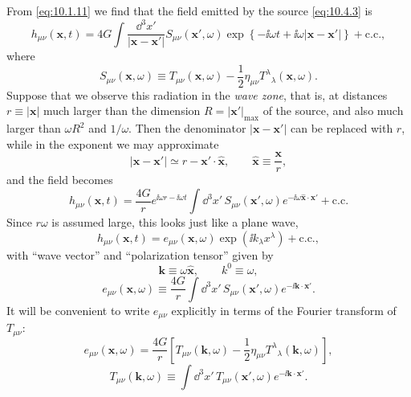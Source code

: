 From \eqref{eq:10.1.11} we find that the field emitted by the source
\eqref{eq:10.4.3} is
\begin{equation}
  h_{\mu\nu}(\mathbf{x},t)
  =
  4G\int\frac{\dd^3x'}{\lvert\mathbf{x}-\mathbf{x}'\rvert}
  S_{\mu\nu}(\mathbf{x}',\omega)
  \exp\!\left\{-\ii\omega t
  +\ii\omega\lvert\mathbf{x}-\mathbf{x}'\rvert\right\}
  +\text{c.c.},
  \tag{10.4.4}\label{eq:10.4.4}
\end{equation}
where
\begin{equation}
  S_{\mu\nu}(\mathbf{x},\omega)
  \equiv
  T_{\mu\nu}(\mathbf{x},\omega)
  -\frac12\eta_{\mu\nu}T^\lambda{}_\lambda(\mathbf{x},\omega).
  \tag{10.4.5}\label{eq:10.4.5}
\end{equation}
Suppose that we observe this radiation in the \emph{wave zone}, that is, at
distances \(r\equiv\lvert\mathbf{x}\rvert\) much larger than the dimension
\(R=\lvert\mathbf{x}'\rvert_{\max}\) of the source, and also much larger
than \(\omega R^2\) and \(1/\omega\). Then the denominator
\(\lvert\mathbf{x}-\mathbf{x}'\rvert\) can be replaced with \(r\), while
in the exponent we may approximate
\[
  \lvert\mathbf{x}-\mathbf{x}'\rvert
  \simeq r-\mathbf{x}'\cdot\widehat{\mathbf{x}},
  \qquad
  \widehat{\mathbf{x}}\equiv\frac{\mathbf{x}}{r},
\]
and the field becomes
\begin{equation}
  h_{\mu\nu}(\mathbf{x},t)
  =
  \frac{4G}{r}e^{\ii\omega r-\ii\omega t}
  \int \dd^3x'\,
  S_{\mu\nu}(\mathbf{x}',\omega)
  e^{-\ii\omega\widehat{\mathbf{x}}\cdot\mathbf{x}'}
  +\text{c.c.}
  \tag{10.4.6}\label{eq:10.4.6}
\end{equation}
Since \(r\omega\) is assumed large, this looks just like a plane wave,
\begin{equation}
  h_{\mu\nu}(\mathbf{x},t)
  =
  e_{\mu\nu}(\mathbf{x},\omega)
  \exp(\ii k_\lambda x^\lambda)
  +\text{c.c.},
  \tag{10.4.7}\label{eq:10.4.7}
\end{equation}
with ``wave vector'' and ``polarization tensor'' given by
\begin{equation}
  \mathbf{k}\equiv\omega\widehat{\mathbf{x}},
  \qquad
  k^0\equiv\omega,
  \tag{10.4.8}\label{eq:10.4.8}
\end{equation}
\begin{equation}
  e_{\mu\nu}(\mathbf{x},\omega)
  \equiv
  \frac{4G}{r}\int \dd^3x'\,
  S_{\mu\nu}(\mathbf{x}',\omega)e^{-\ii\mathbf{k}\cdot\mathbf{x}'}.
  \tag{10.4.9}\label{eq:10.4.9}
\end{equation}
It will be convenient to write \(e_{\mu\nu}\) explicitly in terms of the
Fourier transform of \(T_{\mu\nu}\):
\begin{equation}
  e_{\mu\nu}(\mathbf{x},\omega)
  =
  \frac{4G}{r}
  \left[
    T_{\mu\nu}(\mathbf{k},\omega)
    -\frac12\eta_{\mu\nu}T^\lambda{}_\lambda(\mathbf{k},\omega)
  \right],
  \tag{10.4.10}\label{eq:10.4.10}
\end{equation}
\begin{equation}
  T_{\mu\nu}(\mathbf{k},\omega)
  \equiv
  \int \dd^3x'\,
  T_{\mu\nu}(\mathbf{x}',\omega)e^{-\ii\mathbf{k}\cdot\mathbf{x}'}.
  \tag{10.4.11}\label{eq:10.4.11}
\end{equation}


